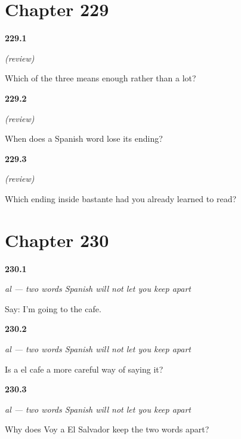 \section*{Chapter 229}

\noindent\begin{minipage}[t]{\linewidth}
\raggedright
\hypertarget{review-ES-C60-repaso-grado-scale}{\textbf{229.1}} \emph{(review)}\par
\small Which of the three means enough rather than a lot?
\end{minipage}\par\medskip

\noindent\begin{minipage}[t]{\linewidth}
\raggedright
\hypertarget{review-ES-C60-repaso-grado-short}{\textbf{229.2}} \emph{(review)}\par
\small When does a Spanish word lose its ending?
\end{minipage}\par\medskip

\noindent\begin{minipage}[t]{\linewidth}
\raggedright
\hypertarget{review-ES-C60-repaso-grado-ante}{\textbf{229.3}} \emph{(review)}\par
\small Which ending inside bastante had you already learned to read?
\end{minipage}\par\medskip

\section*{Chapter 230}

\noindent\begin{minipage}[t]{\linewidth}
\raggedright
\hypertarget{review-ES-C61-al-say}{\textbf{230.1}} \emph{al — two words Spanish will not let you keep apart}\par
\small Say: I'm going to the cafe.
\end{minipage}\par\medskip

\noindent\begin{minipage}[t]{\linewidth}
\raggedright
\hypertarget{review-ES-C61-al-must}{\textbf{230.2}} \emph{al — two words Spanish will not let you keep apart}\par
\small Is a el cafe a more careful way of saying it?
\end{minipage}\par\medskip

\noindent\begin{minipage}[t]{\linewidth}
\raggedright
\hypertarget{review-ES-C61-al-name}{\textbf{230.3}} \emph{al — two words Spanish will not let you keep apart}\par
\small Why does Voy a El Salvador keep the two words apart?
\end{minipage}\par\medskip


